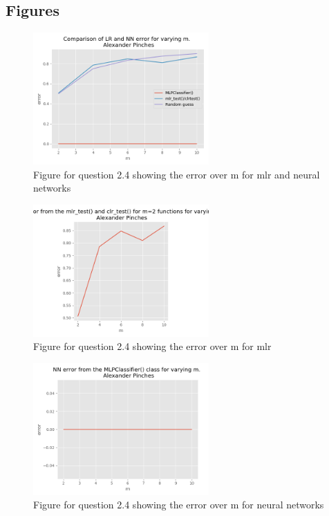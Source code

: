\documentclass{article}
\begin{document}
\subsection*{Figures}
\begin{figure}[h!]
\centering
\includegraphics[width=0.6\textwidth]{graph.png}
\caption{Figure for question 2.4 showing the error over m for mlr and neural networks}
\label{fig21}
\end{figure}
\begin{figure}[h!]
\centering
\includegraphics[width=0.6\textwidth]{graphLR.png}
\caption{Figure for question 2.4 showing the error over m for mlr}
\label{lr}
\end{figure}
\begin{figure}[h!]
\centering
\includegraphics[width=0.6\textwidth]{graphNN.png}
\caption{Figure for question 2.4 showing the error over m for neural networks}
\label{nn}
\end{figure}







\end{document}
